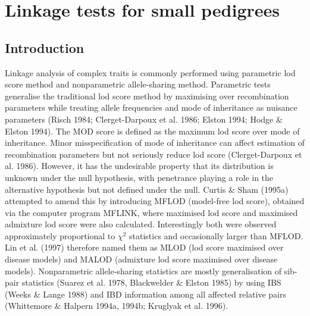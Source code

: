 
\chapter{Linkage tests for small pedigrees}

\section{Introduction}

Linkage analysis of complex traits is commonly performed using parametric lod
score method and nonparametric allele-sharing method.  Parametric tests
generalise the traditional lod score method by maximising over recombination
parameters while treating allele frequencies and mode of inheritance as
nuisance parameters (Risch 1984; Clerget-Darpoux et al.  1986; Elston 1994;
Hodge \& Elston 1994).  The MOD score is defined as the maximum lod score over
mode of inheritance.  Minor misspecification of mode of inheritance can affect
estimation of recombination parameters but not seriously reduce lod score
(Clerget-Darpoux et al.  1986).  However, it has the undesirable property that
its distribution is unknown under the null hypothesis, with penetrance playing
a role in the alternative hypothesis but not defined under the null.  Curtis \&
Sham (1995a) attempted to amend this by introducing MFLOD (model-free lod
score), obtained via the computer program MFLINK, where maximised lod score and
maximised admixture lod score were also calculated.  Interestingly both were
observed approximately proportional to $\chi^2$ statistics and occasionally
larger than MFLOD.  Lin et al.  (1997) therefore named them as MLOD (lod score
maximised over disease models) and MALOD (admixture lod score maximised over
disease models).  Nonparametric allele-sharing statistics are mostly
generalisation of sib-pair statistics (Suarez et al.  1978, Blackwelder \&
Elston 1985) by using IBS (Weeks \& Lange 1988) and IBD information among all
affected relative pairs (Whittemore \& Halpern 1994a, 1994b; Kruglyak et al.
1996).

